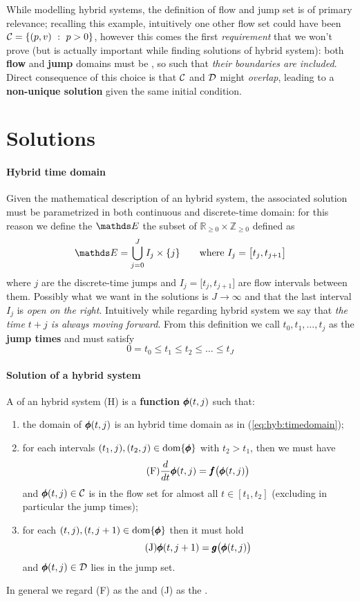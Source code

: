 	While modelling hybrid systems, the definition of flow and jump set is of primary relevance; recalling this example, intuitively one other flow set could have been $\mathcal C = \{ (p,v) \ : \ p > 0 \}$, however this comes the first \textit{requirement} that we won't prove (but is actually important while finding solutions of hybrid system): both \textbf{flow} and \textbf{jump} domains must be , so such that \textit{their boundaries are included}. Direct consequence of this choice is that $\mathcal C$ and $\mathcal D$ might \textit{overlap}, leading to a \textbf{non-unique solution} given the same initial condition.
	
\section{Solutions}
	\paragraph{Hybrid time domain} Given the mathematical description of an hybrid system, the associated solution must be parametrized in both continuous and discrete-time domain: for this reason we define the  $\hsol$ the subset of $\mathds R_{\geq 0} \times \mathds Z_{\geq 0}$ defined as
	\begin{equation} \label{eq:hyb:timedomain}
		\hsol = \bigcup_{j=0}^J I_j\times \{j\} \qquad \textrm{where } I_j = \big[t_j, t_{j+1} \big]
	\end{equation}
	where $j$ are the discrete-time jumps and $I_j = \big[t_j, t_{j+1}\big]$ are flow intervals between them. Possibly what we want in the solutions is $J\rightarrow \infty$ and that the last interval $I_j$ is \textit{open on the right}. Intuitively while regarding hybrid system we say that \textit{the time $t+j$ is always moving forward}. From this definition we call $t_0,t_1,\dots, t_j$ as the \textbf{jump times} and must satisfy
	\[ 0 = t_0 \leq t_1 \leq t_2 \leq \dots \leq t_J \] 
	
	\paragraph{Solution of a hybrid system} A  of an hybrid system (H) is a \textbf{function} $\pmb{\phi}(t, j)$ such that:
	\begin{enumerate}
		\item the domain of $\pmb{\phi}(t,j)$ is an hybrid time domain as in (\ref{eq:hyb:timedomain});
		\item for each intervals $(t_1,j),(t_2,j) \in \textrm{dom}\{\pmb{\phi}\}$ with $t_2> t_1$, then we must have
		\[ \tag{F} \frac{d}{dt} \pmb{\phi}(t,j) = \pmb{f} \big(\pmb{\phi}(t,j)\big) \]
		and $\pmb{\phi}(t,j) \in \mathcal C$ is in the flow set for almost all $t\in [t_1,t_2]$ (excluding in particular the jump times);
		\item for each $(t,j), (t, j+1)\in \textrm{dom}\{\pmb{\phi}\}$ then it must hold
		\[ \tag{J} \pmb{\phi}(t, j+1) = \pmb{g}\big(\pmb{\phi}(t,j)\big) \]
		and $\pmb{\phi}(t,j) \in \mathcal D$ lies in the jump set.
	\end{enumerate}
	In general we regard (F) as the  and (J) as the .
	
